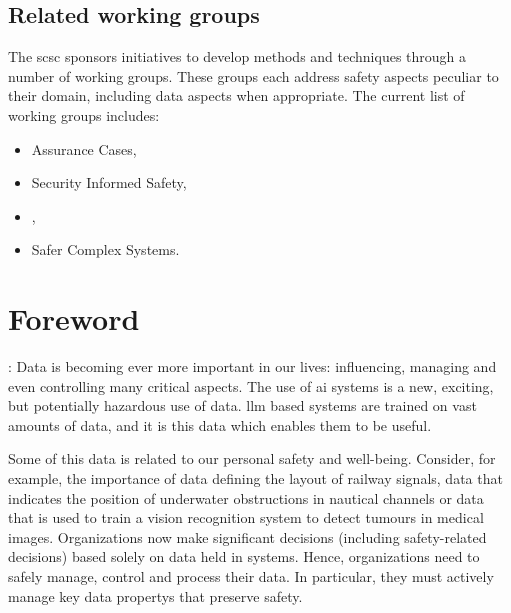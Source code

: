\subsection*{Related working groups}
The \gls{scsc} sponsors initiatives to develop methods and techniques through a number of working groups. These groups each address safety aspects peculiar to their domain, including data aspects when appropriate. The current list of working groups includes:
%
\begin{itemize}
  \item Assurance Cases,
  \item Security Informed Safety,
  \item {},
  \item Safer Complex Systems. 
\end{itemize}
%
%
\clearpage
%

\makeatletter		%
\dsiwg@intblankpage
\makeatother

\pagestyle{FirstPageFrontMatter}
\section*{Foreword}


:
Data is becoming ever more important in our lives: influencing, managing and even controlling many critical aspects.
The use of \gls{ai} systems is a new, exciting, but potentially hazardous use of data. \Gls{llm} based systems are trained on vast amounts of data, and it is this data which enables them to be useful.

Some of this data is related to our personal safety and well-being.
Consider, for example, the importance of data defining the layout of railway signals,
data that indicates the position of underwater obstructions in nautical channels or data that
is used to train a vision recognition system to detect tumours in medical images.
Organizations now make significant decisions (including safety-related decisions) based solely on data held in systems.
Hence, organizations need to safely manage, control and process their data.
In particular, they must actively manage key \glspl{data property} that preserve safety.

